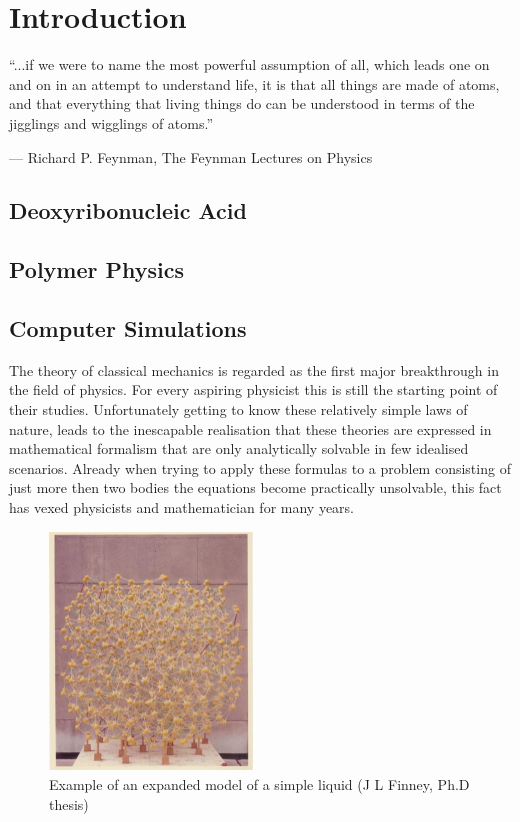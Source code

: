\chapter{Introduction}
\vspace{-1cm}
\epigraphfontsize{\small\itshape}
\epigraph{“...if we were to name the most powerful assumption of all, which leads one on
and on in an attempt to understand life, it is that all things are made of atoms, and
that everything that living things do can be understood in terms of the jigglings and
wigglings of atoms.”}
{--- \textup{Richard P. Feynman}, The Feynman Lectures on Physics\cite{feynmanLectures}}

\section{Deoxyribonucleic Acid}

\section{Polymer Physics}

\newpage

\section{Computer Simulations}

The theory of classical mechanics is regarded as the first major breakthrough in the
field of physics. For every aspiring physicist this is still the starting point of their
studies. Unfortunately getting to know these relatively simple laws of nature, leads to
the inescapable realisation that these theories are expressed in mathematical formalism
that are only analytically solvable in few idealised scenarios. Already when trying to
apply these formulas to a problem consisting of just more then two bodies the equations
become practically unsolvable, this fact has vexed physicists and mathematician for many
years.\\


\begin{figure}
  \begin{center}
    \includegraphics[width=0.48\textwidth]{Figures/WaterModel.png}
  \end{center}
  \caption{Example of an expanded model of a simple liquid (J L Finney, Ph.D thesis)}
\end{figure}


